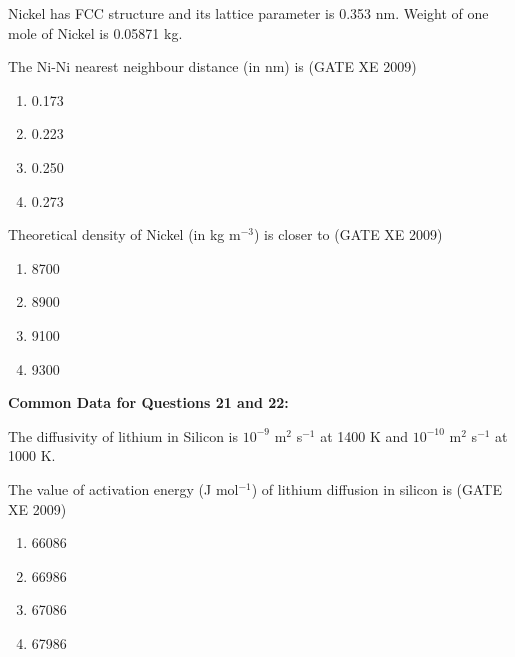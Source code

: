     Nickel has FCC structure and its lattice parameter is 0.353 nm. Weight of one mole of Nickel is 0.05871 kg.

    \item The Ni-Ni nearest neighbour distance (in nm) is \hfill (GATE XE 2009)

    \begin{multicols}{4}
        \begin{enumerate}
            \item 0.173
            \item 0.223
            \item 0.250
            \item 0.273
        \end{enumerate}
    \end{multicols}

    \item Theoretical density of Nickel (in kg m$^{-3}$) is closer to \hfill (GATE XE 2009)

    \begin{multicols}{4}
        \begin{enumerate}
            \item 8700
            \item 8900
            \item 9100
            \item 9300
        \end{enumerate}
    \end{multicols}

    \item[] \textbf{Common Data for Questions 21 and 22:}
    
    The diffusivity of lithium in Silicon is $10^{-9}$ m$^2$ s$^{-1}$ at 1400 K and $10^{-10}$ m$^2$ s$^{-1}$ at 1000 K.
    
    \item The value of activation energy (J mol$^{-1}$) of lithium diffusion in silicon is \hfill (GATE XE 2009)
    \begin{multicols}{4}
        \begin{enumerate}
            \item 66086
            \item 66986
            \item 67086
            \item 67986
        \end{enumerate}
    \end{multicols}

